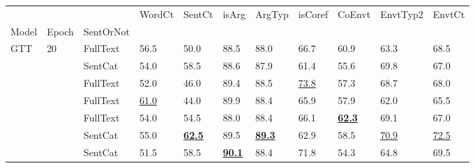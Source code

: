 \begin{tabular}{lllllllllll}
\toprule
    &    &          &                     WordCt &                     SentCt &                      isArg &                     ArgTyp &                    isCoref &                     CoEnvt &                   EnvtTyp2 &                     EnvtCt \\
Model & Epoch & SentOrNot &                            &                            &                            &                            &                            &                            &                            &                            \\
\midrule
GTT & 20 & FullText &                       56.5 &                       50.0 &                       88.5 &                       88.0 &                       66.7 &                       60.9 &                       63.3 &                       68.5 \\
    &    & SentCat &                       54.0 &                       58.5 &                       88.6 &                       87.9 &                       61.4 &                       55.6 &                       69.8 &                       67.0 \\
    &    & FullText &                       52.0 &                       46.0 &                       89.4 &                       88.5 &           \underline{73.8} &                       57.3 &                       68.7 &                       68.0 \\
    &    & FullText &           \underline{61.0} &                       44.0 &                       89.9 &                       88.4 &                       65.9 &                       57.9 &                       62.0 &                       65.5 \\
    &    & FullText &                       54.0 &                       54.5 &                       88.0 &                       88.4 &                       66.1 &  \underline{\textbf{62.3}} &                       69.1 &                       67.0 \\
    &    & SentCat &                       55.0 &  \underline{\textbf{62.5}} &                       89.5 &  \underline{\textbf{89.3}} &                       62.9 &                       58.5 &           \underline{70.9} &           \underline{72.5} \\
    &    & SentCat &                       51.5 &                       58.5 &  \underline{\textbf{90.1}} &                       88.4 &                       71.8 &                       54.3 &                       64.8 &                       69.5 \\

\end{tabular}
